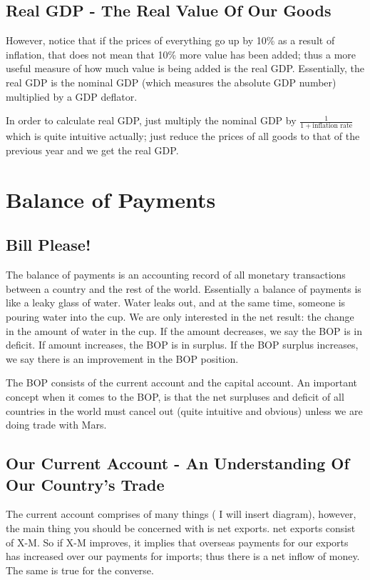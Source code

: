 \subsection{Real GDP - The Real Value Of Our Goods}
However, notice that if the prices of everything go up by 10\% as a result of inflation, that does not mean that 10\% more value has been added; thus a more useful measure of how much value is being added is the real GDP. Essentially, the real GDP is the nominal GDP (which measures the absolute GDP number) multiplied by a GDP deflator.

In order to calculate real GDP, just multiply the nominal GDP by $\frac{1}{1+\textrm{inflation rate}}$ which is quite intuitive actually; just reduce the prices of all goods to that of the previous year and we get the real GDP.
\section{Balance of Payments}
\subsection{Bill Please!}
The balance of payments is an accounting record of all monetary transactions between a country and the rest of the world. Essentially a balance of payments is like a leaky glass of water. Water leaks out, and at the same time, someone is pouring water into the cup. We are only interested in the net result: the change in the amount of water in the cup. If the amount decreases, we say the BOP is in deficit. If amount increases, the BOP is in surplus. If the BOP surplus increases, we say there is an improvement in the BOP position.

The BOP consists of the current account and the capital account. An important concept when it comes to the BOP, is that the net surpluses and deficit of all countries in the world must cancel out (quite intuitive and obvious) unless we are doing trade with Mars.
\subsection{Our Current Account - An Understanding Of Our Country's Trade}
The current account comprises of many things ( I will insert diagram), however, the main thing you should be concerned with is net exports. net exports consist of X-M. So if X-M improves, it implies that overseas payments for our exports has increased over our payments for imports; thus there is a net inflow of money. The same is true for the converse.

